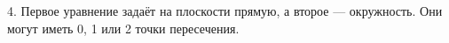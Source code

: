 4. Первое уравнение задаёт на плоскости прямую, а второе --- окружность. Они могут иметь 0, 1 или 2 точки пересечения.\\
